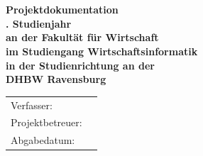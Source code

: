 \begin{titlepage}
	\begin{center}
		\vspace*{1cm}
		\LARGE\bf\myTopic\\
		\Large\rm\mySubTopic\\
		\vspace*{2cm}
		\bf Projektdokumentation\\
		\vspace*{0.5cm}\singlespacing
		\normalsize\rm
		\myPraxPhase. Studienjahr \\
		\vspace*{0.5cm}\singlespacing
		an der Fakultät für Wirtschaft\\
		im Studiengang Wirtschaftsinformatik\\
		in der Studienrichtung \myFieldOfStudy
		\vspace*{0.5cm}\singlespacing
		an der\\
		DHBW Ravensburg
		\vfill
	\end{center}
	\begin{tabular}{ll}
		Verfasser:&\myAutor\\
		Projektbetreuer:&\myProf\\
		Abgabedatum:&\myEndDate\\
	\end{tabular}
	
\end{titlepage}
\newpage
\setcounter{page}{2}
